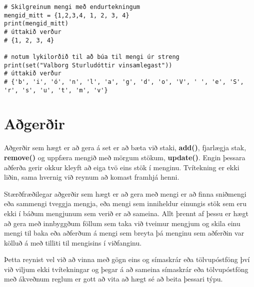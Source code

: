 \begin{lstlisting}[caption=Mengi skilgreind, label=lst:set-duplicate]
# Skilgreinum mengi með endurtekningum
mengid_mitt = {1,2,3,4, 1, 2, 3, 4}
print(mengid_mitt)
# úttakið verður 
# {1, 2, 3, 4}

# notum lykilorðið til að búa til mengi úr streng
print(set("Valborg Sturludóttir vinsamlegast"))
# úttakið verður
# {'b', 'i', 'ó', 'n', 'l', 'a', 'g', 'd', 'o', 'V', ' ', 'e', 'S', 'r', 's', 'u', 't', 'm', 'v'}
\end{lstlisting}

\section{Aðgerðir}
Aðgerðir sem hægt er að gera á set er að bæta við staki, \textbf{add()}, fjarlægja stak, \textbf{remove()} og uppfæra mengið með mörgum stökum, \textbf{update()}.
Engin þessara aðferða gerir okkur kleyft að eiga tvö eins stök í menginu.
Tvítekning er ekki liðin, sama hvernig við reynum að komast framhjá henni.

Stærðfræðilegar aðgerðir sem hægt er að gera með mengi er að finna sniðmengi eða sammengi tveggja mengja, eða mengi sem inniheldur einungis stök sem eru ekki í báðum mengjunum sem verið er að sameina. Allt þrennt af þessu er hægt að gera með innbyggðum föllum sem taka við tveimur mengjum og skila einu mengi til baka eða aðferðum á mengi sem breyta þá menginu sem aðferðin var kölluð á með tilliti til mengisins í viðfanginu.

Þetta reynist vel við að vinna með gögn eins og símaskrár eða tölvupóstföng því við viljum ekki tvítekningar og þegar á að sameina símaskrár eða tölvupóstföng með ákveðnum reglum er gott að vita að hægt sé að beita þessari týpu.